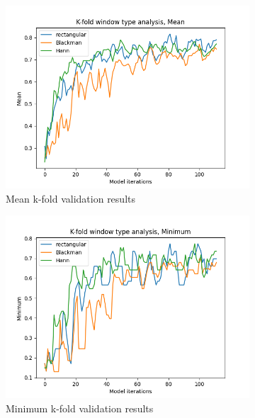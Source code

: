 \begin{figure}[hbt!]
    \begin{subfigure}[b]{0.5\textwidth}
        \includegraphics[width=\linewidth]{Images/kfoldMean.png}
        \caption{Mean k-fold validation results}
        \label{fig:KMean}
    \end{subfigure}
    \hfill
    \begin{subfigure}[b]{0.5\textwidth}
        \includegraphics[width=\linewidth]{Images/kfoldMinimum.png}
        \caption{Minimum k-fold validation results}
        \label{fig:KMin}
    \end{subfigure}
    \hfill
    \begin{subfigure}[b]{0.5\textwidth}

\end{subfigure}
\end{figure}
